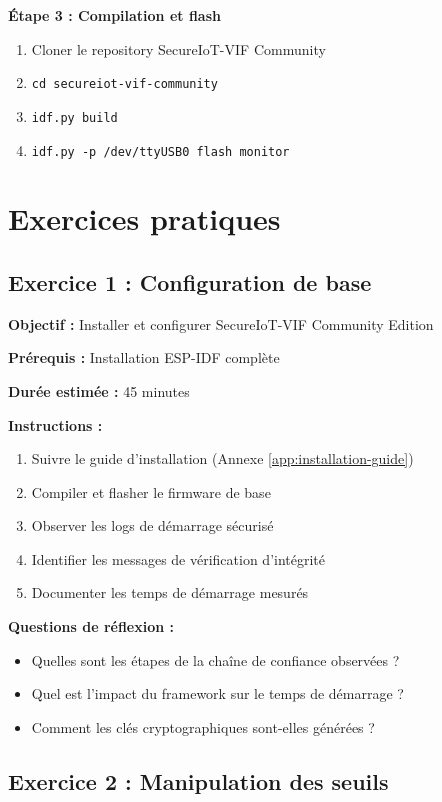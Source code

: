 \textbf{Étape 3 : Compilation et flash}
\begin{enumerate}
    \item Cloner le repository SecureIoT-VIF Community
    \item \texttt{cd secureiot-vif-community}
    \item \texttt{idf.py build}
    \item \texttt{idf.py -p /dev/ttyUSB0 flash monitor}
\end{enumerate}

\section{Exercices pratiques}
\label{app:exercises}

\subsection{Exercice 1 : Configuration de base}

\textbf{Objectif :} Installer et configurer SecureIoT-VIF Community Edition

\textbf{Prérequis :} Installation ESP-IDF complète

\textbf{Durée estimée :} 45 minutes

\textbf{Instructions :}
\begin{enumerate}
    \item Suivre le guide d'installation (Annexe \ref{app:installation-guide})
    \item Compiler et flasher le firmware de base
    \item Observer les logs de démarrage sécurisé
    \item Identifier les messages de vérification d'intégrité
    \item Documenter les temps de démarrage mesurés
\end{enumerate}

\textbf{Questions de réflexion :}
\begin{itemize}
    \item Quelles sont les étapes de la chaîne de confiance observées ?
    \item Quel est l'impact du framework sur le temps de démarrage ?
    \item Comment les clés cryptographiques sont-elles générées ?
\end{itemize}

\subsection{Exercice 2 : Manipulation des seuils}

